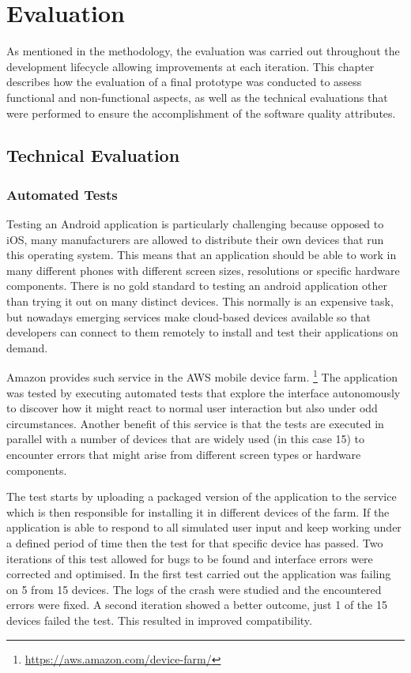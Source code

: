 \chapter{Evaluation}
As mentioned in the methodology, the evaluation was carried out throughout the development lifecycle allowing improvements at each iteration. This chapter describes how the evaluation of a final prototype was conducted to assess functional and non-functional aspects, as well as the technical evaluations that were performed to ensure the accomplishment of the software quality attributes. 

\section{Technical Evaluation}

\subsection{Automated Tests}

Testing an Android application is particularly challenging because opposed to iOS, many manufacturers are allowed to distribute their own devices that run this operating system. This means that an application should be able to work in many different phones with different screen sizes, resolutions or specific hardware components. There is no gold standard to testing an android application other than trying it out on many distinct devices. This normally is an expensive task, but nowadays emerging services make cloud-based devices available so that developers can connect to them remotely to install and test their applications on demand.

Amazon provides such service in the AWS mobile device farm. \footnote{\url{https://aws.amazon.com/device-farm/}} The application was tested by executing automated tests that explore the interface autonomously to discover how it might react to normal user interaction but also under odd circumstances. Another benefit of this service is that the tests are executed in parallel with a number of devices that are widely used (in this case 15) to encounter errors that might arise from different screen types or hardware components. 

The test starts by uploading a packaged version of the application to the service which is then responsible for installing it in different devices of the farm. If the application is able to respond to all simulated user input and keep working under a defined period of time then the test for that specific device has passed. Two iterations of this test allowed for bugs to be found and interface errors were corrected and optimised. In the first test carried out the application was failing on 5 from 15 devices. The logs of the crash were studied and the encountered errors were fixed. A second iteration showed a better outcome, just 1 of the 15 devices failed the test. This resulted in improved compatibility.   

